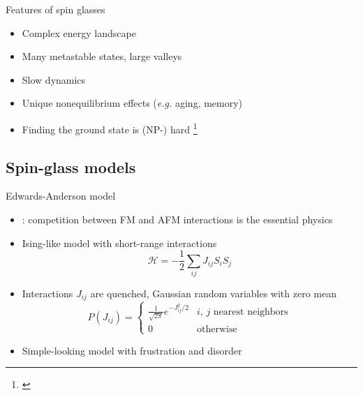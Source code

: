 \documentclass{beamer}
\newcommand{\ham}{\mathcal{H}}
\begin{document}
\begin{frame}{Features of spin glasses}
  \begin{itemize}
    \item \alert{Complex energy landscape}
    \item Many metastable states, large valleys
    \item \alert{Slow dynamics}
    \item Unique nonequilibrium effects (\textit{e.g.} aging, memory)
    \item Finding the ground state is (NP-) hard%
      \footnote{\textcite{barahona1982computational}}
  \end{itemize}
  \centering
  \begin{figure}
  \end{figure}
\end{frame}


\subsection{Spin-glass models}

\begin{frame}{Edwards-Anderson model}
  \begin{itemize}
    \item \textcite{edwards1975theory}: competition between FM and AFM interactions
      is the essential physics
    \item Ising-like model with \alert{short-range} interactions
      \begin{equation*}
        \ham = -\frac{1}{2} \sum_{ij} J_{ij} S_i S_j
      \end{equation*}
    \item Interactions $J_{ij}$ are quenched, Gaussian random variables with
      zero mean
      \begin{equation*}
        P(J_{ij})=
        \begin{cases}
          \frac{1}{\sqrt{2\pi}} e^{-J_{ij}^2/2} &
          \text{$i$, $j$ nearest neighbors} \\
          0 & \text{otherwise}
        \end{cases}
      \end{equation*}
    \item Simple-looking model with \alert{frustration} and \alert{disorder}
  \end{itemize}
\end{frame}
\end{document}
